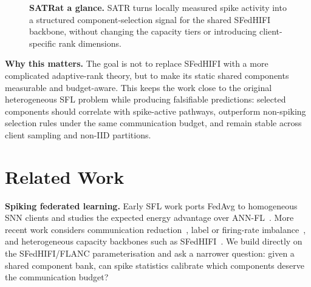 \documentclass{article} %
\newcommand{\method}{SATR\xspace}
\newcommand{\methodbf}{\textbf{SATR}}
\begin{document}
\begin{figure}[t]
\centering
{}
\caption{\textbf{\methodbf at a glance.} \method turns locally measured spike activity into a structured component-selection signal for the shared SFedHIFI backbone, without changing the capacity tiers or introducing client-specific rank dimensions.}
\label{fig:overview}
\end{figure}

\textbf{Why this matters.} The goal is not to replace SFedHIFI with a more complicated adaptive-rank theory, but to make its static shared components measurable and budget-aware. This keeps the work close to the original heterogeneous SFL problem while producing falsifiable predictions: selected components should correlate with spike-active pathways, outperform non-spiking selection rules under the same communication budget, and remain stable across client sampling and non-IID partitions.

\section{Related Work}
\label{sec:related}

\textbf{Spiking federated learning.} Early SFL work ports FedAvg to homogeneous SNN clients and studies the expected energy advantage over ANN-FL~\citep{venkatesha2021federated, skatchkovsky2020federated}. More recent work considers communication reduction~\citep{nguyen2024flts, chaki2023communication}, label or firing-rate imbalance~\citep{yu2025fedlec, zhan2024sfedca}, and heterogeneous capacity backbones such as SFedHIFI~\citep{tao2026sfedhifi}. We build directly on the SFedHIFI/FLANC parameterisation and ask a narrower question: given a shared component bank, can spike statistics calibrate which components deserve the communication budget?
\end{document}
